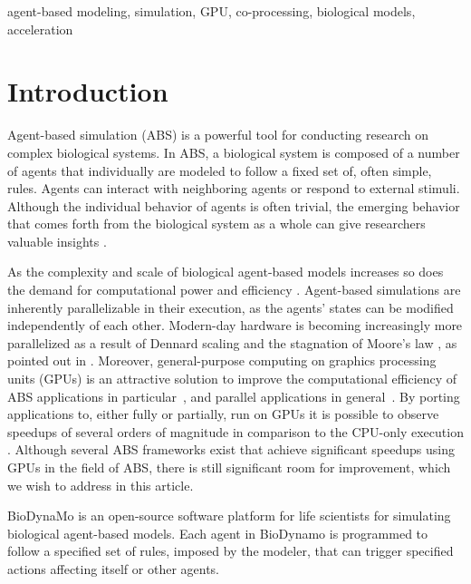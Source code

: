 \documentclass[conference]{IEEEtran}
\begin{document}
\begin{IEEEkeywords}
agent-based modeling, simulation, GPU, co-processing, biological models, acceleration
\end{IEEEkeywords}

\section{Introduction}
\par Agent-based simulation (ABS) is a powerful tool for conducting research on complex biological systems.
In ABS, a biological system is composed of a number of agents that individually are modeled to follow a fixed set of, often simple, rules.
Agents can interact with neighboring agents or respond to external stimuli.
Although the individual behavior of agents is often trivial, the emerging behavior that comes forth from the biological system as a whole can give researchers valuable insights \cite{macal2009agent, an2009agent, di2006vivo}.
\par As the complexity and scale of biological agent-based models increases so does the demand for computational power and efficiency \cite{an2009agent}.
Agent-based simulations are inherently parallelizable in their execution, as the agents' states can be modified independently of each other.
Modern-day hardware is becoming increasingly more parallelized as a result of Dennard scaling \cite{fiori2014electronics} and the stagnation of Moore's law \cite{moore1965cramming}, as pointed out in \cite{breitwieser2021biodynamo}.
Moreover, general-purpose computing on graphics processing units (GPUs) is an attractive solution to improve the computational efficiency of ABS applications in particular~\cite{lysenko2008, richmond_high_2010}, and parallel applications in general~\cite{gpu_genomics,gpu_brain}.
By porting applications to, either fully or partially, run on GPUs it is possible to observe speedups of several orders of magnitude in comparison to the CPU-only execution \cite{nickolls2010gpu}.
Although several ABS frameworks exist that achieve significant speedups using GPUs in the field of ABS, there is still significant room for improvement, which we wish to address in this article.
\par BioDynaMo \cite{breitwieser2021biodynamo} is an open-source software platform for life scientists for simulating biological agent-based models.
Each agent in BioDynamo is programmed to follow a specified set of rules, imposed by the modeler, that can trigger specified actions affecting itself or other agents.
\end{document}
